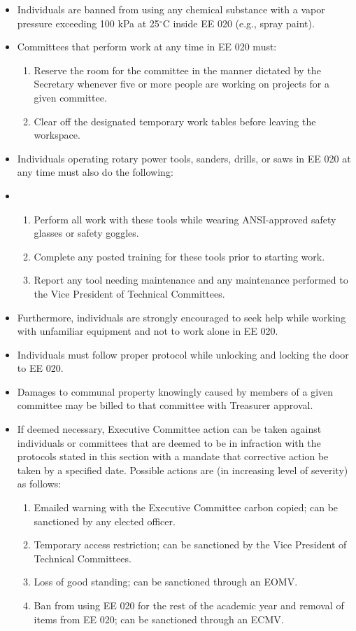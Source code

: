 \documentclass[12pt]{constitution}
\begin{document}
\begin{itemize}
\begin{enumerate}
\begin{itemize}
        \end{itemize}
    \end{enumerate}
    \item Individuals are banned from using any chemical substance with a vapor pressure exceeding 100 kPa at 25$^{\circ}$C inside EE 020 (e.g., spray paint).
    \item Committees that perform work at any time in EE 020 must:
    \begin{enumerate}
        \item Reserve the room for the committee in the manner dictated by the Secretary whenever five or more people are working on projects for a given committee.
        \item Clear off the designated temporary work tables before leaving the workspace.
    \end{enumerate}
    \item Individuals operating rotary power tools, sanders, drills, or saws in EE 020 at any time must also do the following:
    \item
    \begin{enumerate}
        \item Perform all work with these tools while wearing ANSI-approved safety glasses or safety goggles.
        \item Complete any posted training for these tools prior to starting work.
        \item Report any tool needing maintenance and any maintenance performed to the Vice President of Technical Committees.
    \end{enumerate}
    \item Furthermore, individuals are strongly encouraged to seek help while working with unfamiliar equipment and not to work alone in EE 020.
    \item Individuals must follow proper protocol while unlocking and locking the door to EE 020. 
    \item Damages to communal property knowingly caused by members of a given committee may be billed to that committee with Treasurer approval.
    \item If deemed necessary, Executive Committee action can be taken against individuals or committees that are deemed to be in infraction with the protocols stated in this section with a mandate that corrective action be taken by a specified date. Possible actions are (in increasing level of severity) as follows:
    \begin{enumerate}
        \item Emailed warning with the Executive Committee carbon copied; can be sanctioned by any elected officer.
        \item Temporary access restriction; can be sanctioned by the Vice President of Technical Committees.
        \item Loss of good standing; can be sanctioned through an EOMV.
        \item Ban from using EE 020 for the rest of the academic year and removal of items from EE 020; can be sanctioned through an ECMV.
    \end{enumerate}
\end{itemize}
\end{document}
